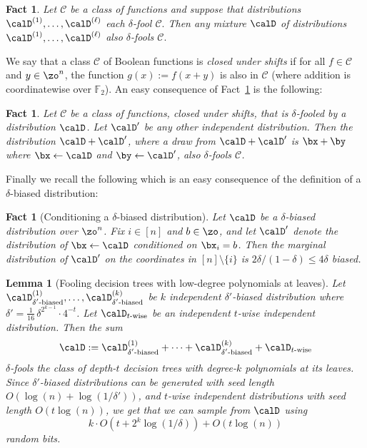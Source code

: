 \documentclass[11pt]{article}
\numberwithin{equation}{section}
\newtheorem{lemma}[theorem]{Lemma}
\newtheorem{fact}[theorem]{Fact}
\theoremstyle{definition}
\theoremstyle{plain}
\theoremstyle{plain}
\renewcommand{\F}{\mathds{F}}
\begin{document}
\begin{fact} \label{fact:mix}
Let $\mathscr{C}$ be a class of functions and suppose that distributions $\calD^{(1)},\dots,\calD^{(\ell)}$ each $\delta$-fool $\mathscr{C}.$
Then any mixture $\calD$ of distributions $\calD^{(1)},\dots,\calD^{(\ell)}$ also $\delta$-fools $\mathscr{C}.$
\end{fact}


We say that a class $\mathscr{C}$ of Boolean functions is \emph{closed under shifts} if for all $f \in \mathscr{C}$ and $y \in \zo^n$, the function $g(x) := f(x + y)$ is also in $\mathscr{C}$ (where addition is %
coordinatewise    %
over $\F_2$).
An easy consequence of Fact~\ref{fact:mix} is the following:

\begin{fact}
\label{fact:more-is-better} 
Let $\mathscr{C}$ be a class of functions, closed under shifts, that is $\delta$-fooled by a distribution $\calD$. Let $\calD'$ be any other independent distribution. Then the distribution $\calD + \calD'$, where a draw from $\calD + \calD'$ is $\bx + \by$ where $\bx \leftarrow \calD$ and $\by\leftarrow\calD'$, also $\delta$-fools $\mathscr{C}$. 
\end{fact} 

Finally we recall the following which is an easy consequence of the definition of a $\delta$-biased distribution:
\begin{fact}[Conditioning a $\delta$-biased distribution]
\label{fact:conditioning}
Let $\calD$ be a $\delta$-biased distribution over $\zo^n$. Fix $i\in [n]$ and $b \in \zo$, and let $\calD'$ denote the distribution of $\bx\leftarrow\calD$ conditioned on $\bx_i = b$.  Then the marginal distribution of $\calD'$ on the coordinates in $[n] \setminus \{i\}$ is $2\delta/(1-\delta) \le 4\delta$ biased.%
\end{fact} 



\begin{lemma}[Fooling decision trees with low-degree polynomials at leaves] 
\label{lem:fool-simple}
Let $\calD^{(1)}_{\text{$\delta'$-biased}},\ldots,\calD^{(k)}_{\text{$\delta'$-biased}}$ be $k$ independent $\delta'$-biased distribution where $\delta' = \frac1{16}\,\delta^{2^{k-1}} \cdot 4^{-t}$. Let $\calD_{\text{$t$-wise}}$ be an independent $t$-wise independent distribution.  Then the sum 
\[ \calD := \calD^{(1)}_{\text{$\delta'$-biased}} + \cdots + \calD^{(k)}_{\text{$\delta'$-biased}} + \calD_{\text{$t$-wise}} \]
$\delta$-fools the class of depth-$t$ decision trees with degree-$k$ polynomials at its leaves.  Since $\delta'$-biased distributions can be generated with seed length $O(\log(n) + \log(1/\delta'))$, and $t$-wise independent distributions with seed length $O(t \log(n))$, we get that we can sample from $\calD$ using 
\[ k \cdot O(t + 2^k\log(1/\delta)) + O(t \log(n)) \] 
random bits. 
\end{lemma} 
\end{document}
